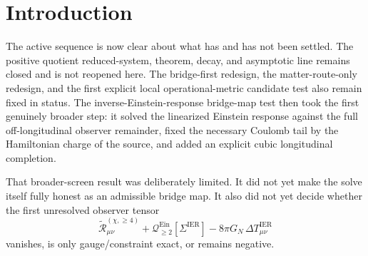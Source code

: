 \documentclass[11pt]{article}
\newcommand{\SigmaIER}{\Sigma^{\mathrm{IER}}}
\newcommand{\ReOffTwo}{\widetilde{\mathcal R}_{\mu\nu}^{\mathrm{off},(2)}}
\newcommand{\ReLongFour}{\widetilde{\mathcal R}_{\mu\nu}^{(\chi,\ge 4)}}
\newcommand{\DeltaTIER}{\Delta T_{\mu\nu}^{\mathrm{IER}}}
\newcommand{\EinQuad}{\mathcal Q_{\ge 2}^{\mathrm{Ein}}}
\newcommand{\HamCharge}{\mathfrak m_{\mathrm H}}
\newcommand{\HamChargeOmega}{\mathfrak m_{\mathrm H,\Omega}}
\begin{document}
\begin{abstract}
The decisive regime is the same purely rotational matter-free regime that forced the Coulomb tail in the first place:
\[
K\equiv0,\qquad
Q^I\equiv0,\qquad
\Omega_{ij}^T\not\equiv0,\qquad
T_{\mu\nu}^{\mathrm{matter}}=0.
\]
There the longitudinal pieces vanish, the matter correction vanishes, and the charge-free regular part decays like \(r^{-2}\). Hence the leading quartic remainder is the Coulomb self-response alone. Writing
\[
\HamChargeOmega\equiv \HamCharge[\ReOffTwo]
=
\frac{\kappa_\Omega}{4}\int_{\mathbb R^3}\abs{\Omega^T}^2\,d^3x>0,
\qquad
U_\Omega(r)=\frac{G_N\,\HamChargeOmega}{r},
\]
one finds on the exterior region of the source support that
\[
n^\mu n^\nu \mathcal R_{\mu\nu}^{\mathrm{IER}}
=
\frac{3\abs{\nabla U_\Omega}^2}{(1+2U_\Omega)^3}
+\mathcal O(r^{-5})
=
\frac{3G_N^2\HamChargeOmega^2}{r^4}
+\mathcal O(r^{-5})>0.
\]
Therefore the quartic remainder neither vanishes nor becomes only gauge/constraint exact in the admissible stationary class. The quartic-and-higher continuation is negative. The inverse-Einstein-response map remains the first broader observer-level bridge map to pass the old quadratic and cubic screens, but it still fails exact closure because the required Coulomb tail feeds a genuine quartic Einstein self-response back into the observer equation. The next live burden is therefore not a substrate-origin note for this map as if closure had succeeded; it is one layer deeper, namely a more fundamental nonlocal bridge-map redesign or substrate mechanism that can control or replace this self-response.
\end{abstract}

\section{Introduction}

The active sequence is now clear about what has and has not been settled. The positive quotient reduced-system, theorem, decay, and asymptotic line remains closed and is not reopened here. The bridge-first redesign, the matter-route-only redesign, and the first explicit local operational-metric candidate test also remain fixed in status. The inverse-Einstein-response bridge-map test then took the first genuinely broader step: it solved the linearized Einstein response against the full off-longitudinal observer remainder, fixed the necessary Coulomb tail by the Hamiltonian charge of the source, and added an explicit cubic longitudinal completion.

That broader-screen result was deliberately limited. It did not yet make the solve itself fully honest as an admissible bridge map. It also did not yet decide whether the first unresolved observer tensor
\[
\ReLongFour+\EinQuad[\SigmaIER]-8\pi G_N\,\DeltaTIER
\]
vanishes, is only gauge/constraint exact, or remains negative.
\end{document}
